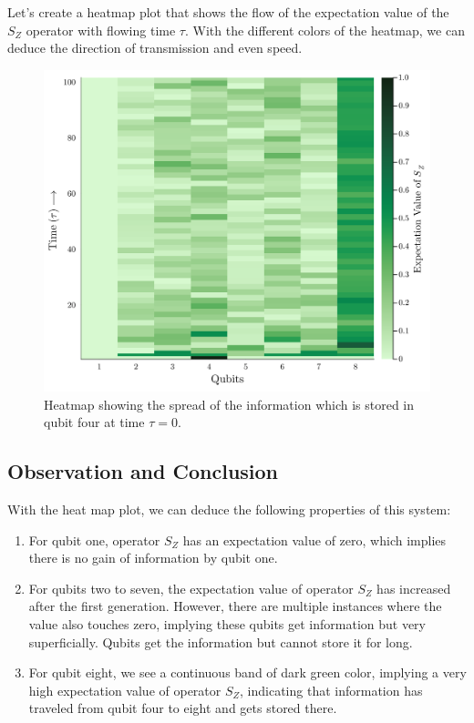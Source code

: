 \documentclass[11pt, oneside, listof=totoc]{scrbook}
\begin{document}
Let's create a heatmap plot that shows the flow of the expectation value of the \(S_Z\) operator with flowing time \(\tau\). With the different colors of the heatmap, we can deduce the direction of transmission and even speed.
\begin{figure}[H]
    \centering
    \includegraphics[width=\textwidth]{spread-Sz.png}
    \caption{Heatmap showing the spread of the information which is stored in qubit four at time \(\tau = 0\).}
    \label{fig:spread}
\end{figure}

\subsection{Observation and Conclusion}
With the heat map plot, we can deduce the following properties of this system:
\begin{enumerate}
    \item For qubit one, operator \(S_Z\) has an expectation value of zero, which implies there is no gain of information by qubit one.

    \item For qubits two to seven, the expectation value of operator \(S_Z\) has increased after the first generation. However, there are multiple instances where the value also touches zero, implying these qubits get information but very superficially. Qubits get the information but cannot store it for long.

    \item For qubit eight, we see a continuous band of dark green color, implying a very high expectation value of operator \(S_Z\), indicating that information has traveled from qubit four to eight and gets stored there.
\end{enumerate}
\end{document}
